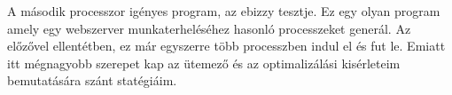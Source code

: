A második processzor igényes program, az ebizzy tesztje. Ez egy olyan program amely egy webszerver munkaterheléséhez hasonló processzeket generál. Az előzővel ellentétben, ez már egyszerre több processzben indul el és fut le. Emiatt itt mégnagyobb szerepet kap az ütemező és az optimalizálási kisérleteim bemutatására szánt statégiáim.
 


